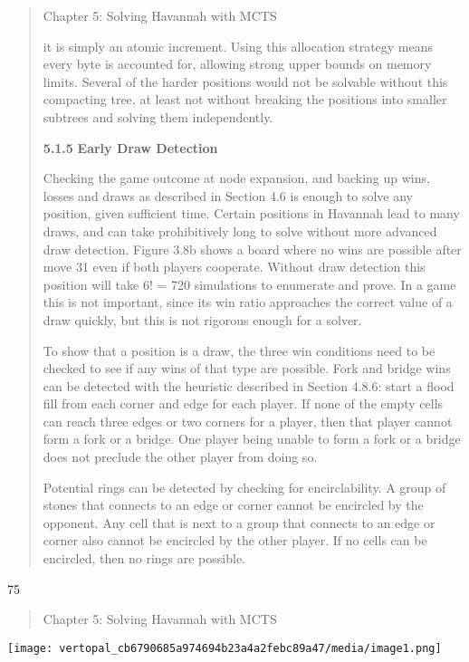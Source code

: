 \documentclass[
]{article}
\begin{document}
\begin{quote}
Chapter 5: Solving Havannah with MCTS

it is simply an atomic increment. Using this allocation strategy means
every byte is accounted for, allowing strong upper bounds on memory
limits. Several of the harder positions would not be solvable without
this compacting tree, at least not without breaking the positions into
smaller subtrees and solving them independently.

\textbf{5.1.5} \textbf{Early Draw Detection}

Checking the game outcome at node expansion, and backing up wins, losses
and draws as described in Section 4.6 is enough to solve any position,
given sufficient time. Certain positions in Havannah lead to many draws,
and can take prohibitively long to solve without more advanced draw
detection. Figure 3.8b shows a board where no wins are possible after
move 31 even if both players cooperate. Without draw detection this
position will take 6! = 720 simulations to enumerate and prove. In a
game this is not important, since its win ratio approaches the correct
value of a draw quickly, but this is not rigorous enough for a solver.

To show that a position is a draw, the three win conditions need to be
checked to see if any wins of that type are possible. Fork and bridge
wins can be detected with the heuristic described in Section 4.8.6:
start a flood fill from each corner and edge for each player. If none of
the empty cells can reach three edges or two corners for a player, then
that player cannot form a fork or a bridge. One player being unable to
form a fork or a bridge does not preclude the other player from doing
so.

Potential rings can be detected by checking for encirclability. A group
of stones that connects to an edge or corner cannot be encircled by the
opponent. Any cell that is next to a group that connects to an edge or
corner also cannot be encircled by the other player. If no cells can be
encircled, then no rings are possible.
\end{quote}

75

\begin{quote}
Chapter 5: Solving Havannah with MCTS
\end{quote}

\texttt{[image: vertopal\_cb6790685a974694b23a4a2febc89a47/media/image1.png]}
\end{document}

